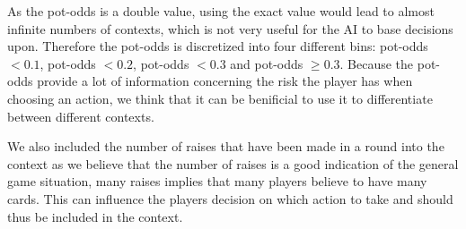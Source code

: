 As the pot-odds is a double value, using the exact value would lead to almost infinite numbers of contexts, which
is not very useful for the AI to base decisions upon. Therefore the pot-odds is discretized into four different bins:
pot-odds $< 0.1$, pot-odds $< 0.2 $, pot-odds $< 0.3$ and pot-odds $\geq 0.3$. Because the pot-odds provide a lot of
information concerning the risk the player has when choosing an action, we think that it can be benificial to use it to
differentiate between different contexts.

We also included the number of raises that have been made in a round into the context as we believe that the number of
raises is a good indication of the general game situation, many raises implies that many players believe to have many
cards. This can influence the players decision on which action to take and should thus be included in the context.
